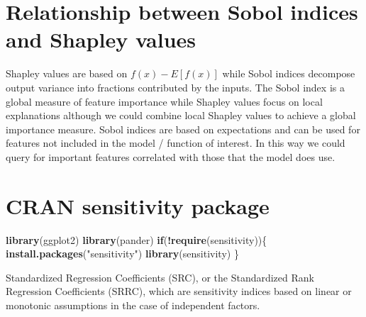 \documentclass[
  11pt,
]{book}
\newenvironment{Shaded}{\begin{snugshade}}{\end{snugshade}}
\newcommand{\ControlFlowTok}[1]{\textcolor[rgb]{0.13,0.29,0.53}{\textbf{#1}}}
\newcommand{\KeywordTok}[1]{\textcolor[rgb]{0.13,0.29,0.53}{\textbf{#1}}}
\newcommand{\NormalTok}[1]{#1}
\newcommand{\OperatorTok}[1]{\textcolor[rgb]{0.81,0.36,0.00}{\textbf{#1}}}
\newcommand{\StringTok}[1]{\textcolor[rgb]{0.31,0.60,0.02}{#1}}
\begin{document}
\hypertarget{relationship-between-sobol-indices-and-shapley-values}{%
\section{Relationship between Sobol indices and Shapley values}\label{relationship-between-sobol-indices-and-shapley-values}}

Shapley values are based on \(f(x)-E[f(x)]\) while Sobol indices decompose output variance into fractions contributed by the inputs. The Sobol index is a global measure of feature importance while Shapley values focus on local explanations although we could combine local Shapley values to achieve a global importance measure. Sobol indices are based on expectations and can be used for features not included in the model / function of interest. In this way we could query for important features correlated with those that the model does use.

\hypertarget{cran-sensitivity-package}{%
\section{CRAN sensitivity package}\label{cran-sensitivity-package}}

\begin{Shaded}
\begin{Highlighting}[]
\KeywordTok{library}\NormalTok{(ggplot2)}
\KeywordTok{library}\NormalTok{(pander)}
\ControlFlowTok{if}\NormalTok{(}\OperatorTok{!}\KeywordTok{require}\NormalTok{(sensitivity))\{}
    \KeywordTok{install.packages}\NormalTok{(}\StringTok{"sensitivity"}\NormalTok{)}
    \KeywordTok{library}\NormalTok{(sensitivity)}
\NormalTok{\}}
\end{Highlighting}
\end{Shaded}

Standardized Regression Coefficients (SRC), or the Standardized Rank Regression Coefficients (SRRC), which are sensitivity indices based on linear or monotonic assumptions in the case of independent factors.
\end{document}
